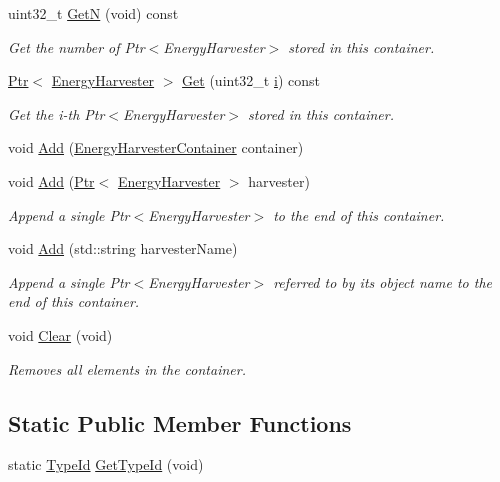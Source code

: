 \begin{DoxyCompactItemize}
uint32\+\_\+t \hyperlink{classns3_1_1EnergyHarvesterContainer_a05b46c9b25acb3296777525bc05c1445}{GetN} (void) const 
\begin{DoxyCompactList}\small\item\em Get the number of Ptr$<$\+Energy\+Harvester$>$ stored in this container. \end{DoxyCompactList}\item 
\hyperlink{classns3_1_1Ptr}{Ptr}$<$ \hyperlink{classns3_1_1EnergyHarvester}{Energy\+Harvester} $>$ \hyperlink{classns3_1_1EnergyHarvesterContainer_a11524d3a7d345f4f647a76708eee4929}{Get} (uint32\+\_\+t \hyperlink{lte__uplink__power__control_8m_a6f6ccfcf58b31cb6412107d9d5281426}{i}) const 
\begin{DoxyCompactList}\small\item\em Get the i-\/th Ptr$<$\+Energy\+Harvester$>$ stored in this container. \end{DoxyCompactList}\item 
void \hyperlink{classns3_1_1EnergyHarvesterContainer_ac8c608d93839d477d9ba0d55a74dbf15}{Add} (\hyperlink{classns3_1_1EnergyHarvesterContainer}{Energy\+Harvester\+Container} container)
\item 
void \hyperlink{classns3_1_1EnergyHarvesterContainer_a014a0edc2fd35c337608a05275ddcfda}{Add} (\hyperlink{classns3_1_1Ptr}{Ptr}$<$ \hyperlink{classns3_1_1EnergyHarvester}{Energy\+Harvester} $>$ harvester)
\begin{DoxyCompactList}\small\item\em Append a single Ptr$<$\+Energy\+Harvester$>$ to the end of this container. \end{DoxyCompactList}\item 
void \hyperlink{classns3_1_1EnergyHarvesterContainer_a8e82fa141badda42e64f124ae09006c4}{Add} (std\+::string harvester\+Name)
\begin{DoxyCompactList}\small\item\em Append a single Ptr$<$\+Energy\+Harvester$>$ referred to by its object name to the end of this container. \end{DoxyCompactList}\item 
void \hyperlink{classns3_1_1EnergyHarvesterContainer_a8d93a69f45ac73cc4b25a60a817bcdcb}{Clear} (void)
\begin{DoxyCompactList}\small\item\em Removes all elements in the container. \end{DoxyCompactList}\end{DoxyCompactItemize}
\subsection*{Static Public Member Functions}
\begin{DoxyCompactItemize}
\item 
static \hyperlink{classns3_1_1TypeId}{Type\+Id} \hyperlink{classns3_1_1EnergyHarvesterContainer_a5c17f466c97d497e31791bb724bb839e}{Get\+Type\+Id} (void)
\end{DoxyCompactItemize}

